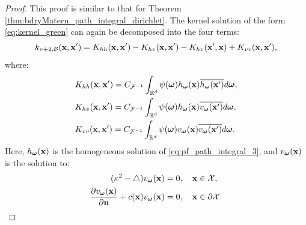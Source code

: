 \documentclass[aos,preprint]{imsart}
\theoremstyle{plain}
\newcommand{\Real}{\mathbb R}
\newcommand{\CalX}{\mathcal X}
\newcommand{\BFx}{\bold x}
\newcommand{\CalF}{\mathcal{F}}
\newcommand{\Bomega}{\boldsymbol{\omega}}
\theoremstyle{remark}
\begin{document}
\begin{proof}

This proof is similar to that for Theorem \ref{thm:bdryMatern_path_integral_dirichlet}. The kernel solution of the form \eqref{eq:kernel_green} can again be decomposed into the four terms:
\begin{equation}
    k_{\nu+2,\mathcal{B}}(\BFx,\BFx')=K_{hh}(\BFx,\BFx')-K_{hv}(\BFx,\BFx')-K_{hv}(\BFx',\BFx)+K_{vv}(\BFx,\BFx'),
    \label{eq:pf_path_integral_robin_2}
\end{equation}
where:
\begin{align}
\begin{split}
    &K_{hh}(\BFx,\BFx')=C_{\CalF^{-1}}\int_{\Real^d}\psi(\Bomega)h_{\Bomega}(\BFx)\overline{h_{\Bomega}(\BFx')}d\Bomega,\\
    &K_{hv}(\BFx,\BFx')=C_{\CalF^{-1}}\int_{\Real^d}\psi(\Bomega)h_{\Bomega}(\BFx)\overline{v_{\Bomega}(\BFx')}d\Bomega,\\
    &K_{vv}(\BFx,\BFx')=C_{\CalF^{-1}}\int_{\Real^d}\psi(\Bomega)v_{\Bomega}(\BFx)\overline{v_{\Bomega}(\BFx')}d\Bomega.
    \label{eq:krep}
\end{split}
\end{align}
Here, $h_{\Bomega}(\BFx)$ is the homogeneous solution of \eqref{eq:pf_path_integral_3}, and $v_{\Bomega}(\BFx)$ is the solution to:
\begin{align}
\begin{split}
    (\kappa^2-\bigtriangleup) v_{\Bomega}(\BFx)&=0,\quad \BFx\in\CalX,\\
    \frac{\partial v_{\Bomega}(\BFx)}{\partial\bold{n}}+c(\BFx)v_{\Bomega}(\BFx)&=0,\quad \BFx\in\partial\CalX. \label{eq:pf_path_integral_robin_1}
\end{split}
\end{align}


\end{proof}
\end{document}
